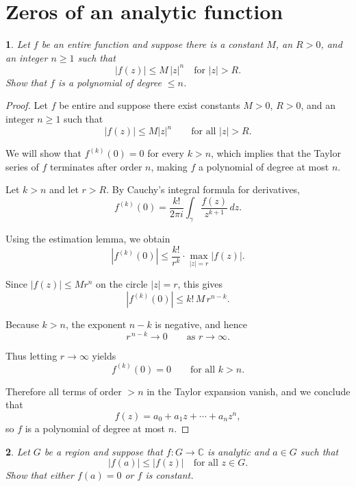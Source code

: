 \documentclass[12pt, a4paper]{report}
\theoremstyle{spaced}
\newtheorem{exercise}{}
\newcommand{\setexercise}[1]{\setcounter{exercise}{#1-1}}
\begin{document}
\section{Zeros of an analytic function}
\setexercise{1}
\begin{exercise}
	Let $f$ be an entire function and suppose there is a constant $M$, an $R>0$, and an integer $n\ge 1$ such that
	\[
		|f(z)| \le M\,|z|^{n} \quad \text{for } |z|>R.
	\]
	Show that $f$ is a polynomial of degree $\le n$.
\end{exercise}

\begin{proof}
	Let $f$ be entire and suppose there exist constants $M>0$, $R>0$, and an integer $n\ge 1$ such that
	\[
		|f(z)| \le M |z|^{n} \qquad \text{for all } |z|>R.
	\]

	We will show that $f^{(k)}(0)=0$ for every $k>n$, which implies that the Taylor series of $f$ terminates after order $n$, making $f$ a polynomial of degree at most $n$.

	Let $k>n$ and let $r>R$.
	By Cauchy's integral formula for derivatives,
	\[
		f^{(k)}(0)
		= \frac{k!}{2\pi i} \int_{\gamma} \frac{f(z)}{z^{k+1}}\,dz.
	\]

	Using the estimation lemma, we obtain
	\[
		|f^{(k)}(0)|
		\le \frac{k!}{r^k} \cdot \max_{|z|=r} |f(z)|.
	\]

	Since $|f(z)| \le M r^{n}$ on the circle $|z|=r$, this gives
	\[
		|f^{(k)}(0)| \le k! \, M \, r^{n-k}.
	\]

	Because $k>n$, the exponent $n-k$ is negative, and hence
	\[
		r^{\,n-k} \to 0 \qquad \text{as } r\to\infty.
	\]

	Thus letting $r\to\infty$ yields
	\[
		f^{(k)}(0)=0 \qquad\text{for all } k>n.
	\]

	Therefore all terms of order $>n$ in the Taylor expansion vanish, and we conclude that
	\[
		f(z) = a_0 + a_1 z + \cdots + a_n z^n,
	\]
	so $f$ is a polynomial of degree at most $n$.
\end{proof}

\setexercise{6}
\begin{exercise}
	Let $G$ be a region and suppose that $f : G \to \mathbb{C}$ is analytic and $a\in G$ such that
	\[
		|f(a)| \le |f(z)| \quad \text{for all } z\in G.
	\]
	Show that either $f(a)=0$ or $f$ is constant.
\end{exercise}
\end{document}
